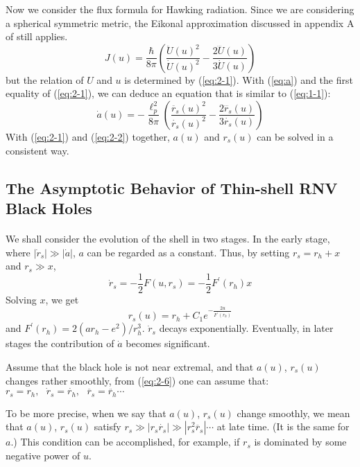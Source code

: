 \documentclass[letterpaper,12pt]{article}
\begin{document}
Now we consider the flux formula for Hawking radiation. Since we are considering a spherical symmetric metric, the Eikonal approximation discussed in appendix A of \cite{kawai2013self} still applies.
\begin{equation}\label{eq:2-4}
J(u)=\frac{
\hbar}{8\pi}\left(\frac{\ddot{U}(u)^{2}}{\dot{U}(u)^{2}}-\frac{2\dddot{U}(u)}{3\dot{U}(u)}\right)
\end{equation}
but the relation of $U$ and $u$ is determined by (\ref{eq:2-1}). With (\ref{eq:a}) and the first equality of (\ref{eq:2-1}), we can deduce an equation that is similar to (\ref{eq:1-1}):
\begin{equation}\label{eq:2-2}
\dot{a}(u) = -\frac{\ell_{p}^{2}}{8\pi}\left(\frac{\ddot{r_{s}}(u)^{2}}{\dot{r_{s}}(u)^{2}}-\frac{2\dddot{r_{s}}(u)}{3\dot{r_{s}}(u)}\right)
\end{equation}
With (\ref{eq:2-1}) and (\ref{eq:2-2}) together, $a(u)$ and $r_{s}(u)$ can be solved in a consistent way.

\subsection{The Asymptotic Behavior of Thin-shell RNV Black Holes}\label{sec:2-1}
\paragraph{ }
We shall consider the evolution of the shell in two stages. In the early stage, where $|\dot{r}_{s}| \gg |\dot{a}|$, $a$ can be regarded as a constant. Thus, by setting $ r_{s} =r_{h} + x$ and $r_{s} \gg x$,
 \begin{equation}
 \dot{r}_{s} =-\frac{1}{2}F(u, r_{s}) =-\frac{1}{2}F^{\prime}(r_{h})x
 \end{equation}
 Solving $x$, we get
 \begin{equation}
 r_{s}(u) = r_{h}+C_{1}e^{-\frac{2u}{F^{\prime}(r_{h})}}
 \end{equation}
and $F^{\prime}(r_{h}) = 2(ar_{h}-e^{2})/r_{h}^{3}$. $\dot{r}_{s}$ decays exponentially. Eventually, in later stages the contribution of $\dot{a}$ becomes significant.

Assume that the black hole is not near extremal, and that $a(u)$, $r_{s}(u)$ changes rather smoothly, from (\ref{eq:2-6}) one can assume that:
 $r_{s} = r_{h}, \textrm{ }\dot{r}_{s} = \dot{r_{h}}, \textrm{ } \ddot{r_{s}}= \ddot{r_{h}} \cdots$

 To be more precise, when we say that $a(u)$, $r_{s}(u)$ change smoothly, we mean that $a(u)$, $r_{s}(u)$ satisfy $r_{s} \gg |r_{s}\dot{r_{s}}| \gg |r^{2}_{s}\ddot{r_{s}}|\cdots $ at late time. (It is the same for $a$.) This condition can be accomplished, for example, if $r_{s}$ is dominated by some negative power of $u$.
\end{document}
